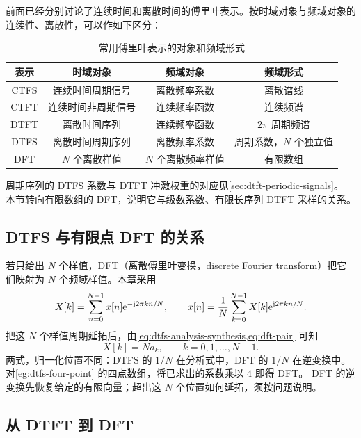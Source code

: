 前面已经分别讨论了连续时间和离散时间的傅里叶表示。按时域对象与频域对象的连续性、离散性，可以作如下区分：
\begin{table}[H]
  \centering
  \caption{常用傅里叶表示的对象和频域形式}
  \label{tab:fourier-representations}
  \begin{tabular}{c c c c}
    \toprule
    表示 & 时域对象 & 频域对象 & 频域形式 \\
    \midrule
    CTFS & 连续时间周期信号 & 离散频率系数 & 离散谱线 \\
    CTFT & 连续时间非周期信号 & 连续频率函数 & 连续频谱 \\
    DTFT & 离散时间序列 & 连续频率函数 & $2\pi$ 周期频谱 \\
    DTFS & 离散时间周期序列 & 离散频率系数 & 周期系数，$N$ 个独立值 \\
    DFT & $N$ 个离散样值 & $N$ 个离散频率样值 & 有限数组 \\
    \bottomrule
  \end{tabular}
\end{table}

周期序列的 DTFS 系数与 DTFT 冲激权重的对应见\cref{sec:dtft-periodic-signals}。
本节转向有限数组的 DFT，说明它与级数系数、有限长序列 DTFT 采样的关系。

\subsection{DTFS 与有限点 DFT 的关系}
\label{subsec:dtfs-dft-relation}

若只给出 $N$ 个样值，DFT（离散傅里叶变换，discrete Fourier transform）把它们映射为 $N$ 个频域样值。本章采用
\begin{equation}
  X[k]=\sum_{n=0}^{N-1}x[n]\mathrm{e}^{-\mathrm{j}2\pi kn/N},\qquad
  x[n]=\frac1N\sum_{k=0}^{N-1}X[k]\mathrm{e}^{\mathrm{j}2\pi kn/N}.
  \label{eq:dft-pair}
\end{equation}
把这 $N$ 个样值周期延拓后，由\cref{eq:dtfs-analysis-synthesis,eq:dft-pair} 可知
\begin{equation}
  X[k]=Na_k,\qquad k=0,1,\ldots,N-1.
  \label{eq:dtfs-dft-normalization}
\end{equation}
两式，归一化位置不同：DTFS 的 $1/N$ 在分析式中，DFT 的 $1/N$ 在逆变换中。
对\cref{eg:dtfs-four-point} 的四点数组，将已求出的系数乘以 $4$ 即得 DFT。
DFT 的逆变换先恢复给定的有限向量；超出这 $N$ 个位置如何延拓，须按问题说明。

\subsection{从 DTFT 到 DFT}
\label{sec:dtft-to-dft}

